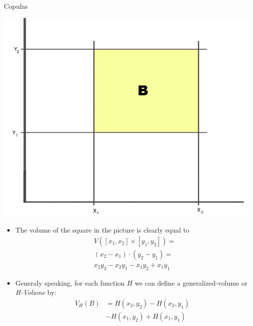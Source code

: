 \documentclass[11pt]{beamer}
\theoremstyle{plain}
\theoremstyle{definition}
\theoremstyle{remark}
\begin{document}
%
\begin{frame}{Copulas}
\noindent
\begin{minipage}{0.5\textwidth}%
\includegraphics[width=\linewidth]{fig/copula_definizione_quadrato.png}
\end{minipage}%
\hfill%
\begin{minipage}{0.5\textwidth}
		\begin{itemize}
				\item The volume of the square in the picture is clearly equal to
						\begin{equation}
								\begin{split}
								& V([x_1, x_2] \times [y_1, y_2]) = \\
								& (x_2-x_1)\cdot (y_2-y_1) = \\
								& x_2y_2 - x_2y_1 -x_1y_2 + x_1y_1
								\end{split}
						\end{equation}
				\item Generaly speaking, for each function $H$ we can define a generalized-volume or \textit{H-Volume} by:
						\begin{equation}
								\begin{split}
								V_H(B) &= H(x_2,y_2) -H( x_2,y_1) \\
								&- H(x_1,y_2) + H( x_1,y_1)
								\end{split}
						\end{equation}
		\end{itemize}
\end{minipage}
\end{frame}
\end{document}
